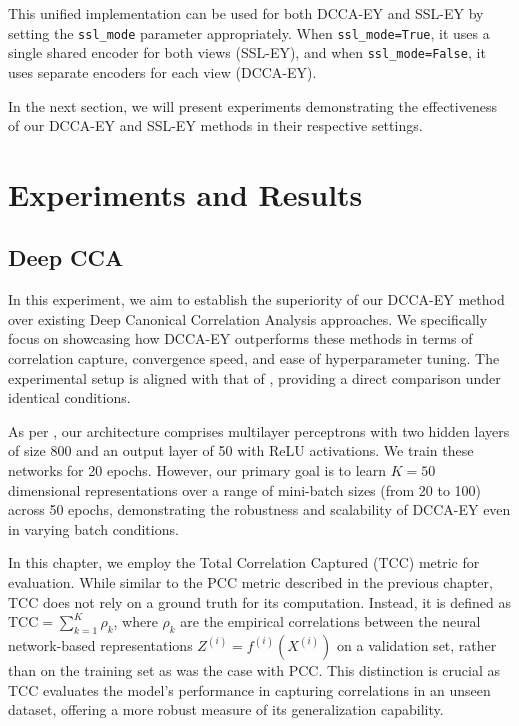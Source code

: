 This unified implementation can be used for both DCCA-EY and SSL-EY by setting the \texttt{ssl\_mode} parameter appropriately. When \texttt{ssl\_mode=True}, it uses a single shared encoder for both views (SSL-EY), and when \texttt{ssl\_mode=False}, it uses separate encoders for each view (DCCA-EY).

In the next section, we will present experiments demonstrating the effectiveness of our DCCA-EY and SSL-EY methods in their respective settings.

\section{Experiments and Results}

\subsection{Deep CCA}\label{sec:experiments-DCCA}
In this experiment, we aim to establish the superiority of our DCCA-EY method over existing Deep Canonical Correlation Analysis approaches.
We specifically focus on showcasing how DCCA-EY outperforms these methods in terms of correlation capture, convergence speed, and ease of hyperparameter tuning.
The experimental setup is aligned with that of \citet{wang2015stochastic}, providing a direct comparison under identical conditions.

As per \citet{wang2015stochastic}, our architecture comprises multilayer perceptrons with two hidden layers of size 800 and an output layer of 50 with ReLU activations.
We train these networks for 20 epochs.
However, our primary goal is to learn $K=50$ dimensional representations over a range of mini-batch sizes (from 20 to 100) across 50 epochs, demonstrating the robustness and scalability of DCCA-EY even in varying batch conditions.

In this chapter, we employ the Total Correlation Captured (TCC) metric for evaluation.
While similar to the PCC metric described in the previous chapter, TCC does not rely on a ground truth for its computation.
Instead, it is defined as \( \text{TCC} = \sum_{k=1}^K \rho_k \), where $\rho_k$ are the empirical correlations between the neural network-based representations $Z^{(i)} = f^{(i)}(X^{(i)})$ on a validation set, rather than on the training set as was the case with PCC. This distinction is crucial as TCC evaluates the model's performance in capturing correlations in an unseen dataset, offering a more robust measure of its generalization capability.
